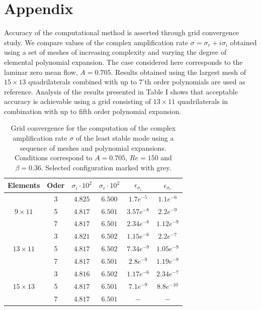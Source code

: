 \documentclass[lineno]{jfm}
\begin{document}

\section*{Appendix}
\label{appendix}
Accuracy of the computational method is asserted
through grid convergence study.
We compare values of the complex amplification rate
$\sigma=\sigma_r+i\sigma_i$ obtained
using a set of meshes of increasing complexity and 
varying the degree of elemental polynomial expansion.
The case considered here corresponds to the laminar zero mean flow, $A=0.705$.
Results obtained using the largest mesh of $15\times13$
quadrilaterals combined with up to $7$'th order polynomials are used
as reference. Analysis of the results presented in Table
I shows that acceptable accuracy is achievable using a
grid consisting of $13\times11$ quadrilaterals in combination with up to fifth order
polynomial expansion.

 \begin{table}
     \centering
\begin{tabular}{|c|c|c|c|c|c|}
\hline 
 {Elements}        & Oder    & $\sigma_{i}\cdot10^{2}$      &  $\sigma_{r}\cdot10^{2}$ &  $\epsilon_{\sigma_i}$   & $\epsilon_{\sigma_r}$   

                        
\\ \hline
                             & 3    & $4.825$      & $6.500$  &  $1.7e^{-5}$  & $1.1e^{-6}$
\\ \cline{2-6}
                $9 \times11$ & 5    & $4.817$      & $6.501$  &  $3.57e^{-8}$  & $2.2e^{-9}$
\\ \cline{2-6} 
                             & 7    & $4.817$      & $6.501$  &  $2.34e^{-8}$  & $1.12e^{-9}$
\\ \hline



                            & 3    & $4.821$      & $6.502$  &  $1.15e^{-6}$  & $2.2e^{-7}$
\\ \cline{2-6}
\rowcolor{Gray}
                $13\times11$   & 5    & $4.817$      & $6.502$  &  $7.34e^{-9}$  & $1.05e^{-9}$ 
\\ \cline{2-6} 
                              & 7    & $4.817$      & $6.501$  &  $2.8e^{-9}$  & $1.19e^{-9}$
\\ \hline
                            & 3    & $4.816$      & $6.502$  &  $1.17e^{-6}$  & $2.34e^{-7}$
\\ \cline{2-6}
                $15\times13$ & 5    & $4.817$      & $6.501$  &  $7.1e^{-9}$  & $8.8e^{-10}$ 
\\ \cline{2-6} 
                              & 7    & $4.817$      & $6.501$  &  $-$  & $-$
\\ \hline
\end{tabular}
\caption{Grid convergence for the computation of the complex amplification rate $\sigma$ of the least stable mode using a sequence of meshes and polynomial expansions. Conditions correspond to $A=0.705$, $Re=150$ and $\beta=0.36$. Selected configuration marked with grey.}
\label{tab:tab1}
\end{table}
\end{document}
